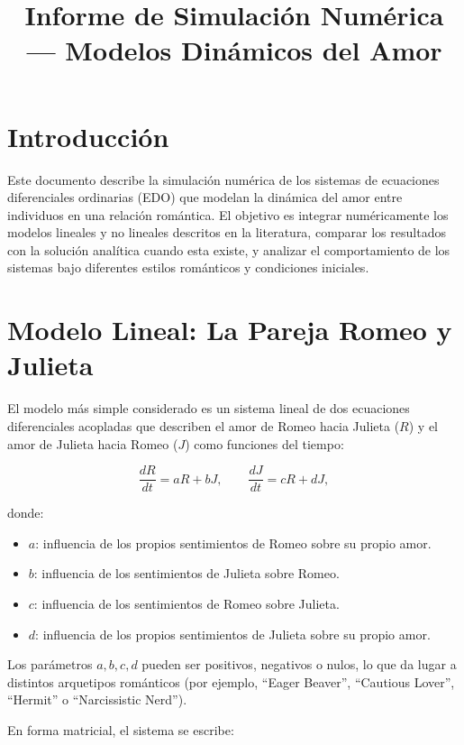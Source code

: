 \documentclass[12pt]{article}
\title{Informe de Simulación Numérica — Modelos Dinámicos del Amor}
\author{}
\date{}
\begin{document}
\maketitle

\section{Introducción}

Este documento describe la simulación numérica de los sistemas de ecuaciones diferenciales ordinarias (EDO) que modelan la dinámica del amor entre individuos en una relación romántica. El objetivo es integrar numéricamente los modelos lineales y no lineales descritos en la literatura, comparar los resultados con la solución analítica cuando esta existe, y analizar el comportamiento de los sistemas bajo diferentes estilos románticos y condiciones iniciales.

\section{Modelo Lineal: La Pareja Romeo y Julieta}

El modelo más simple considerado es un sistema lineal de dos ecuaciones diferenciales acopladas que describen el amor de Romeo hacia Julieta ($R$) y el amor de Julieta hacia Romeo ($J$) como funciones del tiempo:

\begin{equation}
\frac{dR}{dt} = aR + bJ, \qquad
\frac{dJ}{dt} = cR + dJ,
\end{equation}

donde:

\begin{itemize}
    \item $a$: influencia de los propios sentimientos de Romeo sobre su propio amor.
    \item $b$: influencia de los sentimientos de Julieta sobre Romeo.
    \item $c$: influencia de los sentimientos de Romeo sobre Julieta.
    \item $d$: influencia de los propios sentimientos de Julieta sobre su propio amor.
\end{itemize}

Los parámetros $a, b, c, d$ pueden ser positivos, negativos o nulos, lo que da lugar a distintos arquetipos románticos (por ejemplo, ``Eager Beaver'', ``Cautious Lover'', ``Hermit'' o ``Narcissistic Nerd'').

En forma matricial, el sistema se escribe:
\end{document}
